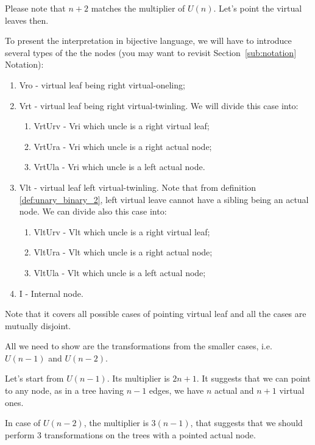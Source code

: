 \documentclass[final]{article}
\theoremstyle{definition}
\theoremstyle{remark}
\begin{document}
Please note that \(n + 2\) matches the multiplier of \(U(n)\). Let's point the virtual leaves then.

To present the interpretation in bijective language, we will have to introduce several types of the the nodes (you may want to revisit Section~\ref{sub:notation} Notation):

\begin{enumerate}
    \item Vro - virtual leaf being right virtual-oneling;
    \item Vrt - virtual leaf being right virtual-twinling. We will divide this case into:
        \begin{enumerate}
            \item VrtUrv - Vri which uncle is a right virtual leaf;
            \item VrtUra - Vri which uncle is a right actual node;
            \item VrtUla - Vri which uncle is a left actual node.
        \end{enumerate}
    \item Vlt - virtual leaf left virtual-twinling. Note that from definition \ref{def:unary_binary_2}, left virtual leave cannot have a sibling being an actual node. We can divide also this case into:
        \begin{enumerate}
            \item VltUrv - Vlt which uncle is a right virtual leaf;
            \item VltUra - Vlt which uncle is a right actual node;
            \item VltUla - Vlt which uncle is a left actual node;
        \end{enumerate}
    \item I - Internal node.
\end{enumerate}

Note that it covers all possible cases of pointing virtual leaf and all the cases are mutually disjoint.

All we need to show are the transformations from the smaller cases, i.e.\ \(U(n-1)\) and \(U(n-2)\).

Let's start from \(U(n-1)\). Its multiplier is \(2n + 1\). It suggests that we can point to any node, as in a tree having \(n - 1\) edges, we have \(n\) actual and \(n + 1\) virtual ones.

In case of \(U(n-2)\), the multiplier is \(3(n-1)\), that suggests that we should perform \(3\) transformations on the trees with a pointed actual node.
\end{document}
